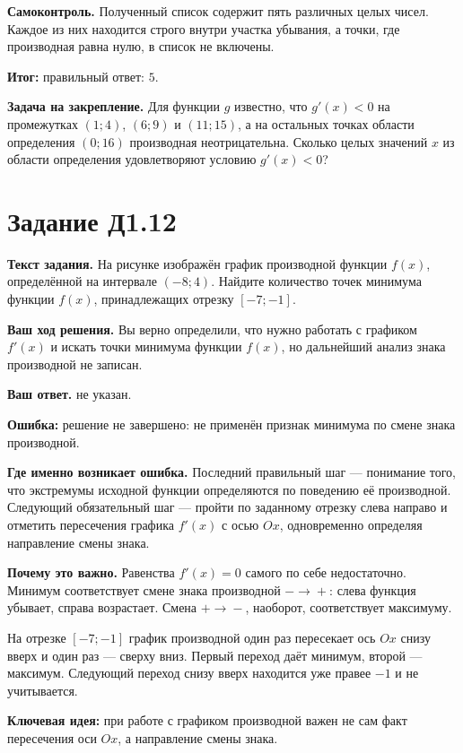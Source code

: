 \documentclass[a4paper,12pt]{article}
\newcommand{\errmark}{\textcolor{red!75!black}{\textbf{Ошибка:}}}
\newcommand{\ideamark}{\textcolor{accent}{\textbf{Ключевая идея:}}}
\newcommand{\resultmark}{\textcolor{resultcolor}{\textbf{Итог:}}}
\begin{document}
\textbf{Самоконтроль.}
Полученный список содержит пять различных целых чисел. Каждое из них находится строго внутри участка убывания, а точки, где производная равна нулю, в список не включены.

\resultmark{} правильный ответ: $5$.

\medskip
\textbf{\textcolor{accent}{Задача на закрепление.}}
Для функции $g$ известно, что $g'(x)<0$ на промежутках $(1;4)$, $(6;9)$ и $(11;15)$, а на остальных точках области определения $(0;16)$ производная неотрицательна. Сколько целых значений $x$ из области определения удовлетворяют условию $g'(x)<0$?

\clearpage
{}\label{task:D1.12}
\section*{Задание Д1.12}

\textbf{Текст задания.}
На рисунке изображён график производной функции $f(x)$, определённой на интервале $(-8;4)$. Найдите количество точек минимума функции $f(x)$, принадлежащих отрезку $[-7;-1]$.

\textbf{Ваш ход решения.}
Вы верно определили, что нужно работать с графиком $f'(x)$ и искать точки минимума функции $f(x)$, но дальнейший анализ знака производной не записан.

\textbf{Ваш ответ.} не указан.

\errmark{} решение не завершено: не применён признак минимума по смене знака производной.

\textbf{Где именно возникает ошибка.}
Последний правильный шаг --- понимание того, что экстремумы исходной функции определяются по поведению её производной. Следующий обязательный шаг --- пройти по заданному отрезку слева направо и отметить пересечения графика $f'(x)$ с осью $Ox$, одновременно определяя направление смены знака.

\textbf{Почему это важно.}
Равенства $f'(x)=0$ самого по себе недостаточно. Минимум соответствует смене знака производной $-\!\to\!+$: слева функция убывает, справа возрастает. Смена $+\!\to\!-$, наоборот, соответствует максимуму.

На отрезке $[-7;-1]$ график производной один раз пересекает ось $Ox$ снизу вверх и один раз --- сверху вниз. Первый переход даёт минимум, второй --- максимум. Следующий переход снизу вверх находится уже правее $-1$ и не учитывается.

\ideamark{} при работе с графиком производной важен не сам факт пересечения оси $Ox$, а направление смены знака.
\end{document}
